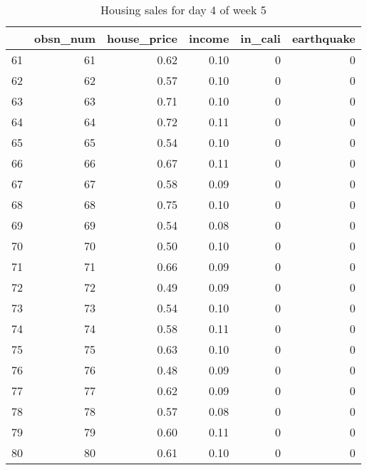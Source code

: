 \begin{table}[ht]
\centering
\begin{tabular}{rrrrrr}
  \hline
 & obsn\_num & house\_price & income & in\_cali & earthquake \\ 
  \hline
61 &  61 & 0.62 & 0.10 &   0 &   0 \\ 
  62 &  62 & 0.57 & 0.10 &   0 &   0 \\ 
  63 &  63 & 0.71 & 0.10 &   0 &   0 \\ 
  64 &  64 & 0.72 & 0.11 &   0 &   0 \\ 
  65 &  65 & 0.54 & 0.10 &   0 &   0 \\ 
  66 &  66 & 0.67 & 0.11 &   0 &   0 \\ 
  67 &  67 & 0.58 & 0.09 &   0 &   0 \\ 
  68 &  68 & 0.75 & 0.10 &   0 &   0 \\ 
  69 &  69 & 0.54 & 0.08 &   0 &   0 \\ 
  70 &  70 & 0.50 & 0.10 &   0 &   0 \\ 
  71 &  71 & 0.66 & 0.09 &   0 &   0 \\ 
  72 &  72 & 0.49 & 0.09 &   0 &   0 \\ 
  73 &  73 & 0.54 & 0.10 &   0 &   0 \\ 
  74 &  74 & 0.58 & 0.11 &   0 &   0 \\ 
  75 &  75 & 0.63 & 0.10 &   0 &   0 \\ 
  76 &  76 & 0.48 & 0.09 &   0 &   0 \\ 
  77 &  77 & 0.62 & 0.09 &   0 &   0 \\ 
  78 &  78 & 0.57 & 0.08 &   0 &   0 \\ 
  79 &  79 & 0.60 & 0.11 &   0 &   0 \\ 
  80 &  80 & 0.61 & 0.10 &   0 &   0 \\ 
   \hline
\end{tabular}
\caption{Housing sales for day 4 of week 5} 
\end{table}
